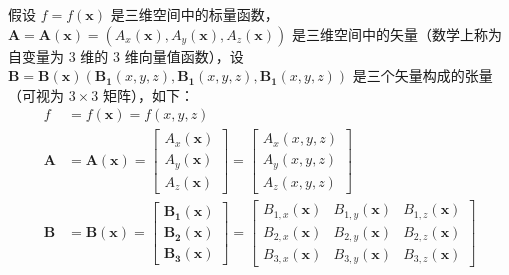 \documentclass[UTF8]{report}
\theoremstyle{MyLineTheoremStyle} %
\theoremstyle{MyBlockTheoremStyle} %
\theoremstyle{MySubsubsectionStyle} %
\begin{document}
假设 $f = f(\boldsymbol{x})$ 是三维空间中的标量函数，$\boldsymbol{A} = \boldsymbol{A}(\boldsymbol{x}) = \left( A_x(\boldsymbol{x}), A_y(\boldsymbol{x}), A_z(\boldsymbol{x}) \right)$ 是三维空间中的矢量（数学上称为自变量为 3 维的 3 维向量值函数），设 $\boldsymbol{B} = \boldsymbol{B}(\boldsymbol{x}) \left( \boldsymbol{B_1}(x,y,z), \boldsymbol{B_1}(x,y,z), \boldsymbol{B_1}(x,y,z) \right)$ 是三个矢量构成的张量（可视为 $3 \times 3$ 矩阵），如下：
\begin{align}
    f &= f(\boldsymbol{x}) = f(x,y,z) 
    \\ 
    \boldsymbol{A} &= \boldsymbol{A}(\boldsymbol{x})  = 
    \begin{bmatrix}
        A_x(\boldsymbol{x}) \\ A_y(\boldsymbol{x}) \\ A_z(\boldsymbol{x})
    \end{bmatrix}=
    \begin{bmatrix}
        A_x(x,y,z) \\ A_y(x,y,z) \\ A_z(x,y,z)
    \end{bmatrix}
    \\ 
    \boldsymbol{B} &= \boldsymbol{B}(\boldsymbol{x}) = 
    \begin{bmatrix}
        \boldsymbol{B_1}(\boldsymbol{x}) \\ \boldsymbol{B_2}(\boldsymbol{x}) \\ \boldsymbol{B_3}(\boldsymbol{x})
    \end{bmatrix} = 
    \begin{bmatrix}
        B_{1,x}(\boldsymbol{x}) & B_{1,y}(\boldsymbol{x}) & B_{1,z}(\boldsymbol{x})\\ 
        B_{2,x}(\boldsymbol{x}) & B_{2,y}(\boldsymbol{x}) & B_{2,z}(\boldsymbol{x})\\
        B_{3,x}(\boldsymbol{x}) & B_{3,y}(\boldsymbol{x}) & B_{3,z}(\boldsymbol{x})
    \end{bmatrix}
\end{align}
\end{document}
